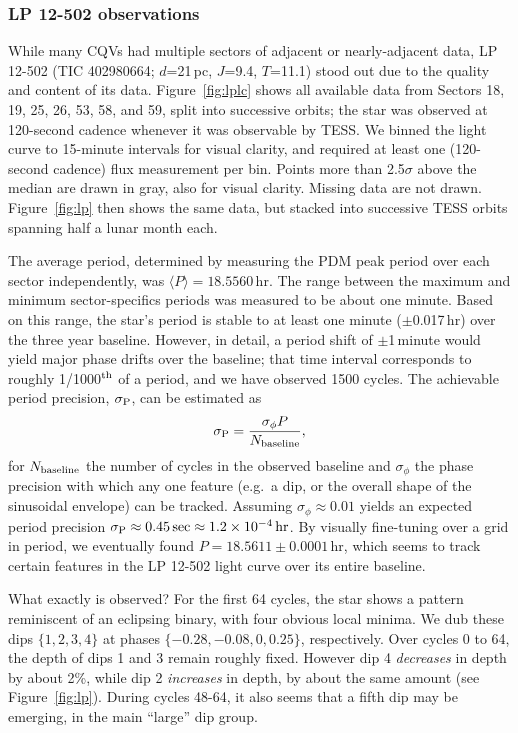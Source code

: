 \documentclass[11pt,twocolumn,tighten]{aastex63}
\begin{document}
\subsubsection{LP 12-502 observations}
While many CQVs had multiple sectors of adjacent or nearly-adjacent
data, LP 12-502 (TIC 402980664; $d$=21\,pc, $J$=9.4, $T$=11.1) stood
out due to the quality and content of its data.  Figure~\ref{fig:lplc}
shows all available data from Sectors 18, 19, 25, 26, 53, 58, and 59,
split into successive orbits; the star was observed at 120-second
cadence whenever it was observable by TESS.  We binned the light curve
to 15-minute intervals for visual clarity, and required at least one
(120-second cadence) flux measurement per bin.  Points more than
2.5$\sigma$ above the median are drawn in gray, also for visual
clarity.  Missing data are not drawn.  Figure~\ref{fig:lp} then shows
the same data, but stacked into successive TESS orbits spanning half a
lunar month each.

The average period, determined by measuring the PDM peak period over
each sector independently, was $\langle P \rangle = 18.5560$\,hr.  The
range between the maximum and minimum sector-specifics periods was
measured to be about one minute.  Based on this range, the star's
period is stable to at least one minute ($\pm$0.017\,hr) over the
three year baseline.  However, in detail, a period shift of
$\pm$1\,minute would yield major phase drifts over the baseline; that
time interval corresponds to roughly 1/1000$^{\rm th}$ of a period,
and we have observed 1500 cycles.  The achievable period precision,
$\sigma_{\rm P}$, can be estimated as
\begin{equation}
  \sigma_{\rm P} = \frac { \sigma_{\phi} P } { N_{\rm baseline} },
\end{equation}
for $N_{\rm baseline}$ the number of cycles in the observed baseline
and $\sigma_{\phi}$ the phase precision with which any one feature
(e.g.~a dip, or the overall shape of the sinusoidal envelope) can be
tracked.  Assuming $\sigma_{\phi} \approx 0.01$ yields an expected
period precision $\sigma_{\rm P} \approx 0.45\,{\rm sec} \approx
1.2\times 10^{-4}\,{\rm hr}$.  By visually fine-tuning over a grid in
period, we eventually found $P=18.5611 \pm 0.0001$\,hr, which seems to
track certain features in the LP 12-502 light curve over its entire
baseline.

What exactly is observed?  For the first 64 cycles, the star shows a
pattern reminiscent of an eclipsing binary, with four obvious local
minima.  We dub these dips $\{ 1, 2, 3, 4 \}$ at phases $\{ -0.28,
-0.08, 0, 0.25 \}$, respectively.  Over cycles 0 to 64, the depth of
dips 1 and 3 remain roughly fixed.  However dip 4 {\it decreases} in
depth by about 2\%, while dip 2 {\it increases} in depth, by about the
same amount (see Figure~\ref{fig:lp}).  During cycles 48-64, it also
seems that a fifth dip may be emerging, in the main ``large'' dip
group.
\end{document}
